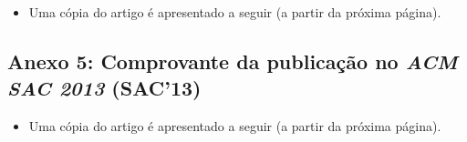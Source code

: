 
\begin{figure}[!h]
 \centering
 \label{fig:comprovante_vmil}
\end{figure}

\begin{itemize}
	\item Uma cópia do artigo é apresentado a seguir (a partir da próxima página).
\end{itemize}
\clearpage



\subsection*{Anexo 5: Comprovante da publicação no \emph{ACM SAC 2013} (SAC'13)} \label{anexo:comprovante_ACMSAC2013}





\begin{itemize}
	\item Uma cópia do artigo é apresentado a seguir (a partir da próxima página).
\end{itemize}
\clearpage


